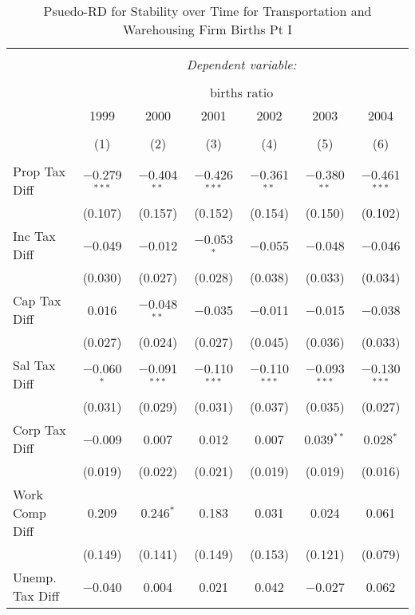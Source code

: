 
\begin{table}[!htbp] \centering 
  \caption{Psuedo-RD for Stability over Time for  Transportation and Warehousing Firm Births Pt I} 
  \label{48-49year} 
\small 
\begin{tabular}{@{\extracolsep{5pt}}lcccccc} 
\\[-1.8ex]\hline 
\hline \\[-1.8ex] 
 & \multicolumn{6}{c}{\textit{Dependent variable:}} \\ 
\cline{2-7} 
\\[-1.8ex] & \multicolumn{6}{c}{births ratio} \\ 
 & 1999 & 2000 & 2001 & 2002 & 2003 & 2004 \\ 
\\[-1.8ex] & (1) & (2) & (3) & (4) & (5) & (6)\\ 
\hline \\[-1.8ex] 
 Prop Tax Diff & $-$0.279$^{***}$ & $-$0.404$^{**}$ & $-$0.426$^{***}$ & $-$0.361$^{**}$ & $-$0.380$^{**}$ & $-$0.461$^{***}$ \\ 
  & (0.107) & (0.157) & (0.152) & (0.154) & (0.150) & (0.102) \\ 
  Inc Tax Diff & $-$0.049 & $-$0.012 & $-$0.053$^{*}$ & $-$0.055 & $-$0.048 & $-$0.046 \\ 
  & (0.030) & (0.027) & (0.028) & (0.038) & (0.033) & (0.034) \\ 
  Cap Tax Diff & 0.016 & $-$0.048$^{**}$ & $-$0.035 & $-$0.011 & $-$0.015 & $-$0.038 \\ 
  & (0.027) & (0.024) & (0.027) & (0.045) & (0.036) & (0.033) \\ 
  Sal Tax Diff & $-$0.060$^{*}$ & $-$0.091$^{***}$ & $-$0.110$^{***}$ & $-$0.110$^{***}$ & $-$0.093$^{***}$ & $-$0.130$^{***}$ \\ 
  & (0.031) & (0.029) & (0.031) & (0.037) & (0.035) & (0.027) \\ 
  Corp Tax Diff & $-$0.009 & 0.007 & 0.012 & 0.007 & 0.039$^{**}$ & 0.028$^{*}$ \\ 
  & (0.019) & (0.022) & (0.021) & (0.019) & (0.019) & (0.016) \\ 
  Work Comp Diff & 0.209 & 0.246$^{*}$ & 0.183 & 0.031 & 0.024 & 0.061 \\ 
  & (0.149) & (0.141) & (0.149) & (0.153) & (0.121) & (0.079) \\ 
  Unemp. Tax Diff & $-$0.040 & 0.004 & 0.021 & 0.042 & $-$0.027 & 0.062 \\ 

\end{tabular}
\end{table}
